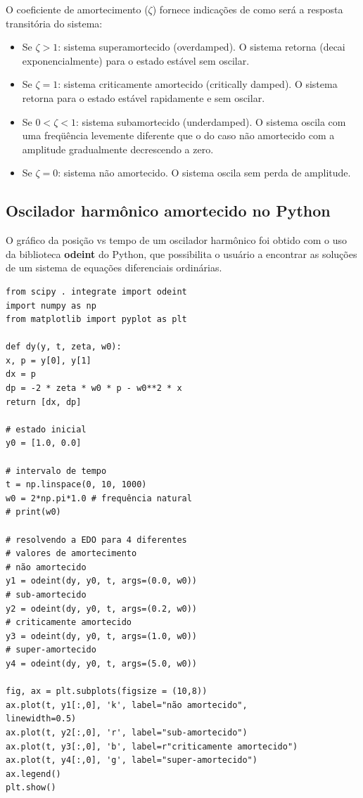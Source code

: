 O coeficiente de amortecimento ($\zeta$) fornece indicações de como será a resposta transitória do sistema:

\begin{itemize}
\item Se $\zeta > 1$: sistema superamortecido (overdamped). O sistema retorna (decai exponencialmente) para o estado estável sem oscilar.
\item Se $\zeta = 1$: sistema criticamente amortecido (critically damped). O sistema retorna para o estado estável rapidamente e sem oscilar.
\item Se $0 < \zeta < 1$: sistema subamortecido (underdamped).  O sistema oscila com uma freqüência levemente diferente que o do caso não amortecido com a amplitude gradualmente decrescendo a zero.
\item Se $\zeta = 0$: sistema não amortecido. O sistema oscila sem perda de amplitude.

\end{itemize}


\subsection{Oscilador harmônico amortecido no Python}

O gráfico da posição vs tempo de um oscilador harmônico foi obtido com o uso da biblioteca \textbf{odeint} do Python, que possibilita o usuário a encontrar as soluções de um sistema de equações diferenciais ordinárias.

\begin{verbatim}
from scipy . integrate import odeint
import numpy as np
from matplotlib import pyplot as plt

def dy(y, t, zeta, w0):
x, p = y[0], y[1]
dx = p
dp = -2 * zeta * w0 * p - w0**2 * x
return [dx, dp]

# estado inicial
y0 = [1.0, 0.0]

# intervalo de tempo
t = np.linspace(0, 10, 1000)
w0 = 2*np.pi*1.0 # frequência natural
# print(w0)

# resolvendo a EDO para 4 diferentes 
# valores de amortecimento
# não amortecido
y1 = odeint(dy, y0, t, args=(0.0, w0)) 
# sub-amortecido
y2 = odeint(dy, y0, t, args=(0.2, w0))
# criticamente amortecido 
y3 = odeint(dy, y0, t, args=(1.0, w0)) 
# super-amortecido
y4 = odeint(dy, y0, t, args=(5.0, w0)) 

fig, ax = plt.subplots(figsize = (10,8))
ax.plot(t, y1[:,0], 'k', label="não amortecido", 
linewidth=0.5)
ax.plot(t, y2[:,0], 'r', label="sub-amortecido")
ax.plot(t, y3[:,0], 'b', label=r"criticamente amortecido")
ax.plot(t, y4[:,0], 'g', label="super-amortecido")
ax.legend()
plt.show()
\end{verbatim}

